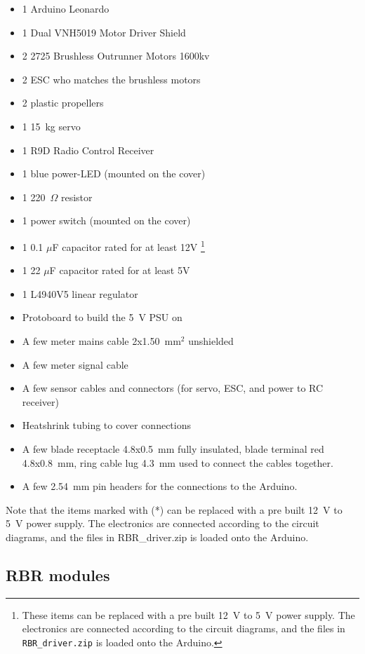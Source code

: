 \begin{itemize}
  \item 1 Arduino Leonardo
  \item 1 Dual VNH5019 Motor Driver Shield
  \item 2 2725 Brushless Outrunner Motors 1600kv
  \item 2 ESC who matches the brushless motors
  \item 2 plastic propellers
  \item 1 15~kg servo
  \item 1 R9D Radio Control Receiver
  \item 1 blue power-LED (mounted on the cover)
  \item 1 220~$\Omega$ resistor
  \item 1 power switch (mounted on the cover)
  \item 1 0.1 $\mu$F capacitor rated for at least 12V \footnote{\label{fotnot_app} These items can be replaced with a pre built 12~V to 5~V power supply. The electronics are connected according to the circuit diagrams, and the files in \texttt{RBR\_driver.zip} is loaded onto the Arduino.} 
  \item 1 22 $\mu$F capacitor rated for at least 5V \footnotemark[1]
  \item 1 L4940V5 linear regulator \footnotemark[1]
  \item Protoboard to build the 5~V PSU on \footnotemark[1]
  \item A few meter mains cable 2x1.50~mm$^2$ unshielded
  \item A few meter signal cable
  \item A few sensor cables and connectors (for servo, ESC, and power to RC
    receiver)
  \item Heatshrink tubing to cover connections
  \item A few blade receptacle 4.8x0.5~mm fully insulated, blade terminal red
    4.8x0.8~mm, ring cable lug 4.3~mm used to connect the cables together.
  \item A few 2.54~mm pin headers for the connections to the Arduino.
\end{itemize}

Note that the items marked with (*) can be replaced with a pre built 12~V to
5~V power supply.  The electronics are connected according to the circuit
diagrams, and the files in RBR\_driver.zip is loaded onto the Arduino.

\subsection{RBR modules}

